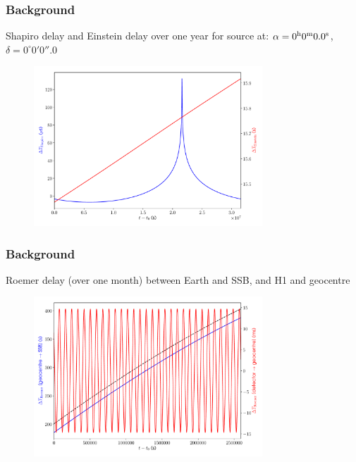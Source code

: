 \begin{frame}

\frametitle{Background}
\label{background}

Shapiro delay and Einstein delay over one year for source at: $\alpha=0^{\rm h}0^{\rm m}0.0^{\rm s}$, $\delta = 0^{\circ}0'0''.0$

\begin{figure}[htbp]
\centering
\includegraphics[keepaspectratio,width=\textwidth,height=170pt]{images/shap_ein_delay.pdf}
\label{shap_ein}
\end{figure}

\end{frame}

\begin{frame}

\frametitle{Background}
\label{background}

Roemer delay (over one month) between Earth and SSB, and H1 and geocentre

\begin{figure}[htbp]
\centering
\includegraphics[keepaspectratio,width=\textwidth,height=170pt]{images/roemer_delay.pdf}
\label{roemer}
\end{figure}

\end{frame}

